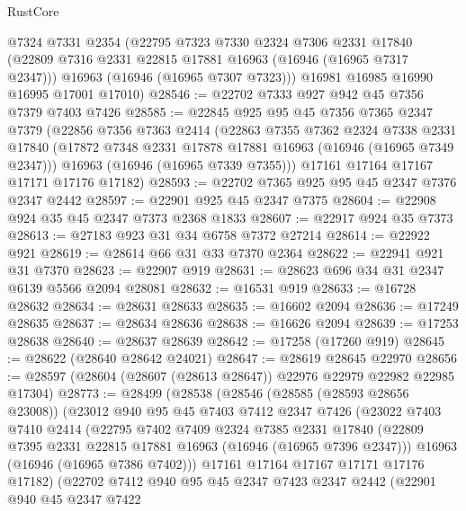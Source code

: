 \begin{lexlean}{RustCore}
\begin{coremodule}
      @7324
      @7331
      @2354
      (@22795
        @7323
        @7330
        @2324
        @7306
        @2331
        @17840
        (@22809 @7316 @2331 @22815 @17881 @16963 (@16946 (@16965 @7317 @2347)))
        @16963
        (@16946 (@16965 @7307 @7323)))
      @16981
      @16985
      @16990
      @16995
      @17001
      @17010)
@28546 := @22702 @7333 @927 @942 @45 @7356 @7379 @7403 @7426
@28585 := @22845
    @925
    @95
    @45
    @7356
    @7365
    @2347
    @7379
    (@22856
      @7356
      @7363
      @2414
      (@22863
        @7355
        @7362
        @2324
        @7338
        @2331
        @17840
        (@17872 @7348 @2331 @17878 @17881 @16963 (@16946 (@16965 @7349 @2347)))
        @16963
        (@16946 (@16965 @7339 @7355)))
      @17161
      @17164
      @17167
      @17171
      @17176
      @17182)
@28593 := @22702 @7365 @925 @95 @45 @2347 @7376 @2347 @2442
@28597 := @22901 @925 @45 @2347 @7375
@28604 := @22908 @924 @35 @45 @2347 @7373 @2368 @1833
@28607 := @22917 @924 @35 @7373
@28613 := @27183 @923 @31 @34 @6758 @7372 @27214
@28614 := @22922 @921
@28619 := @28614 @66 @31 @33 @7370 @2364
@28622 := @22941 @921 @31 @7370
@28623 := @22907 @919
@28631 := @28623 @696 @34 @31 @2347 @6139 @5566 @2094 @28081
@28632 := @16531 @919
@28633 := @16728 @28632
@28634 := @28631 @28633
@28635 := @16602 @2094
@28636 := @17249 @28635
@28637 := @28634 @28636
@28638 := @16626 @2094
@28639 := @17253 @28638
@28640 := @28637 @28639
@28642 := @17258 (@17260 @919)
@28645 := @28622 (@28640 @28642 @24021)
@28647 := @28619 @28645 @22970
@28656 := @28597 (@28604 (@28607 (@28613 @28647)) @22976 @22979 @22982 @22985 @17304)
@28773 := @28499
    (@28538
      (@28546
        (@28585 (@28593 @28656 @23008))
        (@23012
          @940
          @95
          @45
          @7403
          @7412
          @2347
          @7426
          (@23022
            @7403
            @7410
            @2414
            (@22795
              @7402
              @7409
              @2324
              @7385
              @2331
              @17840
              (@22809 @7395 @2331 @22815 @17881 @16963 (@16946 (@16965 @7396 @2347)))
              @16963
              (@16946 (@16965 @7386 @7402)))
            @17161
            @17164
            @17167
            @17171
            @17176
            @17182)
          (@22702
            @7412
            @940
            @95
            @45
            @2347
            @7423
            @2347
            @2442
            (@22901
              @940
              @45
              @2347
              @7422

\end{coremodule}
\end{lexlean}
